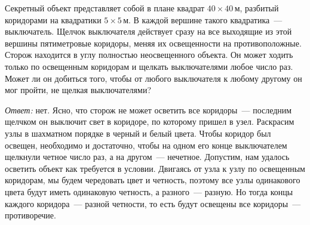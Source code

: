 Секретный объект представляет собой в плане квадрат $40 \times 40\,\text{м}$,
разбитый коридорами на квадратики $5 \times 5\,\text{м}$.
В каждой вершине такого квадратика~--- выключатель.
Щелчок выключателя действует сразу на все выходящие из этой вершины
пятиметровые коридоры, меняя их освещенности на противоположные.
Сторож находится в углу полностью неосвещенного объекта.
Он может ходить только по освещенным коридорам и щелкать выключателями любое
число раз.
Может ли он добиться того, чтобы от любого выключателя к любому другому он мог
пройти, не щелкая выключателями?

\solution
\emph{Ответ:} нет.
Ясно, что сторож не может осветить все коридоры~--- последним щелчком он
выключит свет в коридоре, по которому пришел в узел.
Раскрасим узлы в шахматном порядке в черный и белый цвета.
Чтобы коридор был освещен, необходимо и достаточно, чтобы на одном его конце
выключателем щелкнули четное число раз, а на другом~--- нечетное.
Допустим, нам удалось осветить объект как требуется в условии.
Двигаясь от узла к узлу по освещенным коридорам, мы будем чередовать цвет и
четность, поэтому все узлы одинакового цвета будут иметь одинаковую четность, а
разного~--- разную.
Но тогда концы каждого коридора~--- разной четности, то есть будут освещены все
коридоры~--- противоречие.

